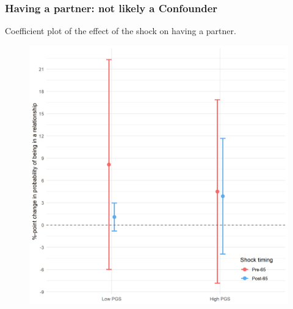 \documentclass[10pt,compress,xcolor=dvipsnames,aspectratio=169]{beamer}    %
\newcounter{ex}
\newcommand{\1}[1]{\mathrm{1\hspace*{-2.5pt}l}[#1]}	%
\begin{document}
\begin{frame}
\frametitle{Having a partner: not likely a Confounder}
Coefficient plot of the effect of the shock on having a partner.
\begin{figure}[hbtp]

\centering
\includegraphics[height=0.8\textheight]{../../3_output/shock_effects/mpart_6070_100_cv.png}
\label{fig:mpart}
\end{figure}
\end{frame}
\end{document}
